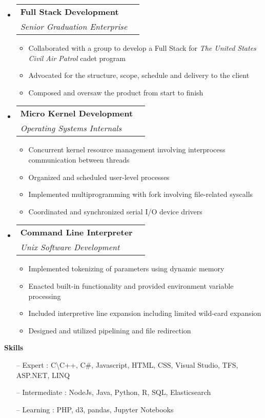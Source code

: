 \documentclass[letterpaper,11pt]{article}
\makeatletter
\newcommand{\resitem}[1]{\item #1 \vspace{-2pt}}
\newcommand{\resheading}[1]{{\large \colorbox{mygrey}{\begin{minipage}{\textwidth}{\textbf{#1 \vphantom{p\^{E}}}}\end{minipage}}}}
\newcommand{\ressubheading}[4]{
\begin{tabular*}{7.0in}{l@{\extracolsep{\fill}}r}
		\textbf{#1} & #2 \\
		\textit{#3} & \textit{#4} \\
\end{tabular*}\vspace{-6pt}}
\makeatother
\begin{document}
\begin{itemize}
\item
	\ressubheading{Full Stack Development}{}{Senior Graduation Enterprise}{}
	\begin{itemize}
		\resitem{Collaborated with a group to develop a Full Stack for \emph{The United States Civil Air Patrol} cadet program}
		\resitem{Advocated for the structure, scope, schedule and delivery to the client}
		\resitem{Composed and oversaw the product from start to finish}
	\end{itemize}
\item
	\ressubheading{Micro Kernel Development}{}{Operating Systems Internals}{}
	\begin{itemize}
		\resitem{Concurrent kernel resource management involving interprocess communication between threads}
		\resitem{Organized and scheduled user-level processes}
		\resitem{Implemented multiprogramming with fork involving file-related syscalls}
		\resitem{Coordinated and synchronized serial I/O device drivers}
	\end{itemize}
\item
	\ressubheading{Command Line Interpreter}{}{Unix Software Development}{}
	\begin{itemize}
		\resitem{Implemented tokenizing of parameters using dynamic memory}
		\resitem{Enacted built-in functionality and provided environment variable processing}
		\resitem{Included interpretive line expansion including limited wild-card expansion}
		\resitem{Designed and utilized pipelining and file redirection}
	\end{itemize}
\end{itemize}
\resheading{Skills}
\begin{itemize}
\item[--] Expert : C\textbackslash C++, C\#, Javascript, HTML, CSS, Visual Studio, TFS, ASP.NET, LINQ\\
\item[--] Intermediate : NodeJs, Java, Python, R, SQL, Elasticsearch\\
\item[--] Learning : PHP, d3, pandas, Jupyter Notebooks 
\end{itemize}
\end{document}
